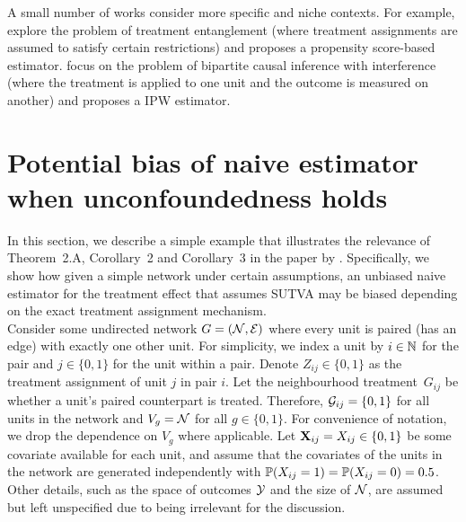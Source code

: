 \documentclass[10pt]{article}
\begin{document}
A small number of works consider more specific and niche contexts. For example, \textcite{Toulis:2018} explore the problem of treatment entanglement (where treatment assignments are assumed to satisfy certain restrictions) and proposes a propensity score-based estimator. \textcite{Zigler:2021} focus on the problem of bipartite causal inference with interference (where the treatment is applied to one unit and the outcome is measured on another) and proposes a IPW estimator.


\section{Potential bias of naive estimator when unconfoundedness holds}

\todo In this section, we describe a simple example that illustrates the relevance of Theorem~2.A, Corollary~2 and Corollary~3 in the paper by \textcite{Forastiere:2021}. Specifically, we show how given a simple network under certain assumptions, an unbiased naive estimator for the treatment effect that assumes SUTVA may be biased depending on the exact treatment assignment mechanism.
\\

Consider some undirected network $G=(\calN,\calE)$ where every unit is paired (has an edge) with exactly one other unit. For simplicity, we index a unit by $i\in\bbN$ for the pair and $j\in\{0,1\}$ for the unit within a pair. Denote $Z_{ij}\in\{0,1\}$ as the treatment assignment of unit $j$ in pair $i$. Let the neighbourhood treatment~$G_{ij}$ be whether a unit's paired counterpart is treated. Therefore, $\calG_{ij}=\{0,1\}$ for all units in the network and $V_g=\calN$ for all $g\in\{0,1\}$. For convenience of notation, we drop the dependence on $V_g$ where applicable. Let $\bfX_{ij}=X_{ij}\in\{0,1\}$ be some covariate available for each unit, and assume that the covariates of the units in the network are generated independently with $\P(X_{ij}=1)=\P(X_{ij}=0)=0.5$. Other details, such as the space of outcomes $\calY$ and the size of $\calN$, are assumed but left unspecified due to being irrelevant for the discussion.
\\
\end{document}

